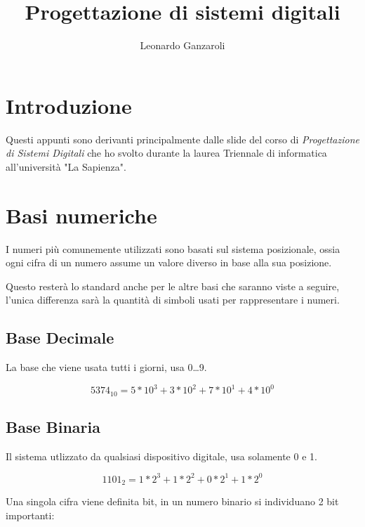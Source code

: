 \documentclass{article}
\title{Progettazione di sistemi digitali}
\author{Leonardo Ganzaroli}
\date{}
\begin{document}
\maketitle


\tableofcontents

\hypersetup{allcolors=black}

\newpage

\section*{Introduzione}

Questi appunti sono derivanti principalmente dalle slide del corso di \textit{Progettazione di Sistemi Digitali} che ho svolto durante la laurea Triennale di informatica all'università "La Sapienza".

\newpage

\section{Basi numeriche}

I numeri più comunemente utilizzati sono basati sul sistema posizionale, ossia ogni cifra di un numero assume un valore diverso in base alla sua posizione. \newline

\noindent Questo resterà lo standard anche per le altre basi che saranno viste a seguire, l'unica differenza sarà la quantità di simboli usati per rappresentare i numeri.

\subsection{Base Decimale}

La base che viene usata tutti i giorni, usa 0\ldots9.

$$5374_{10} = 5*10^3 + 3*10^2 + 7*10^1 + 4*10^0$$

\subsection{Base Binaria}

Il sistema utlizzato da qualsiasi dispositivo digitale, usa solamente 0 e 1.

$$1101_2 = 1*2^3 + 1*2^2 + 0*2^1 + 1*2^0$$\newline

\noindent Una singola cifra viene definita bit, in un numero binario si individuano 2 bit importanti:
\end{document}
